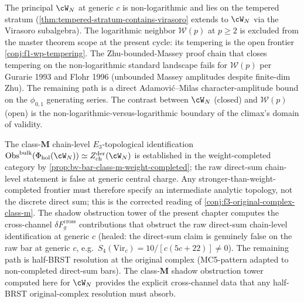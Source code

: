 \begin{remark}
\label{rem:wn-frontier-anchor-f1}
The principal $\cW_N$ at generic $c$ is non-logarithmic and lies
on the tempered stratum
(\cref{thm:tempered-stratum-contains-virasoro} extends to
$\cW_N$ via the Virasoro subalgebra). The logarithmic neighbor
$\mathcal{W}(p)$ at $p \ge 2$ is excluded from the master theorem
scope at the present cycle: its tempering is the open frontier
\cref{conj:f1-wp-tempering}. The Zhu-bounded-Massey proof chain
that closes tempering on the non-logarithmic standard landscape
fails for $\mathcal{W}(p)$ per Gurarie 1993 and Flohr 1996
(unbounded Massey amplitudes despite finite-dim Zhu). The
remaining path is a direct Adamovi\'c--Milas character-amplitude
bound on the $\phi_{0,1}$ generating series. The contrast between
$\cW_N$ (closed) and $\mathcal{W}(p)$ (open) is the
non-logarithmic-versus-logarithmic boundary of the climax's
domain of validity.
\end{remark}

\begin{remark}
\label{rem:wn-frontier-anchor-f3}
The class-$\mathbf{M}$ chain-level $E_{3}$-topological identification
$\mathrm{Obs}^{\mathrm{bulk}}(\Phi_{\mathrm{hol}}(\cW_N))
\simeq Z^{\mathrm{der}}_{\mathrm{ch}}(\cW_N)$ is established in the
weight-completed category by
\ref*{prop:bv-bar-class-m-weight-completed}; the raw direct-sum
chain-level statement is false at generic central charge. Any
stronger-than-weight-completed frontier must therefore specify an
intermediate analytic topology, not the discrete direct sum; this is
the corrected reading of \cref{conj:f3-original-complex-class-m}.
The shadow obstruction
tower of the present chapter computes the cross-channel
$\delta F_g^{\mathrm{cross}}$ contributions that obstruct
the raw direct-sum chain-level identification at generic $c$
(healed: the direct-sum claim is genuinely false on the raw
bar at generic $c$, e.g.\ $S_4(\mathrm{Vir}_c) = 10/[c(5c + 22)]
\neq 0$). The remaining path is half-BRST resolution at the
original complex (MC5-pattern adapted to non-completed direct-sum
bars). The class-$\mathbf{M}$ shadow obstruction tower computed
here for $\cW_N$ provides the explicit cross-channel data that
any half-BRST original-complex resolution must absorb.
\end{remark}
